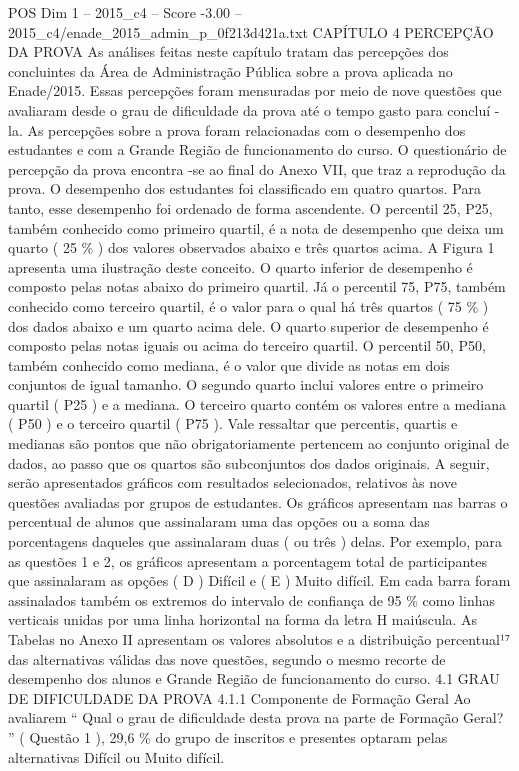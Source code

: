 \begin{textsample}{POS Dim 1 – 2015\_c4 – Score -3.00 – 2015\_c4/enade\_2015\_admin\_p\_0f213d421a.txt}  \label{ex:f1_pos_335}
CAPÍTULO 4 PERCEPÇÃO DA PROVA As análises feitas neste capítulo tratam das percepções dos concluintes da Área de Administração Pública sobre a prova aplicada no Enade/2015.
Essas percepções foram mensuradas por meio de nove questões que avaliaram desde o grau de dificuldade da prova até o tempo gasto para concluí -la.
As percepções sobre a prova foram relacionadas com o desempenho dos estudantes e com a Grande Região de funcionamento do curso.
O questionário de percepção da prova encontra -se ao final do Anexo VII, que traz a reprodução da prova.
O desempenho dos estudantes foi classificado em quatro quartos.
Para tanto, esse desempenho foi ordenado de forma ascendente.
O percentil 25, P25, também conhecido como primeiro quartil, é a nota de desempenho que deixa um quarto ( 25 \% ) dos valores observados abaixo e três quartos acima.
A Figura 1 apresenta uma ilustração deste conceito.
O quarto inferior de desempenho é composto pelas notas abaixo do primeiro quartil.
Já o percentil 75, P75, também conhecido como terceiro quartil, é o valor para o qual há três quartos ( 75 \% ) dos dados abaixo e um quarto acima dele.
O quarto superior de desempenho é composto pelas notas iguais ou acima do terceiro quartil.
O percentil 50, P50, também conhecido como mediana, é o valor que divide as notas em dois conjuntos de igual tamanho.
O segundo quarto inclui valores entre o primeiro quartil ( P25 ) e a mediana.
O terceiro quarto contém os valores entre a mediana ( P50 ) e o terceiro quartil ( P75 ).
Vale ressaltar que percentis, quartis e medianas são pontos que não obrigatoriamente pertencem ao conjunto original de dados, ao passo que os quartos são subconjuntos dos dados originais.
A seguir, serão apresentados gráficos com resultados selecionados, relativos às nove questões avaliadas por grupos de estudantes.
Os gráficos apresentam nas barras o percentual de alunos que assinalaram uma das opções ou a soma das porcentagens daqueles que assinalaram duas ( ou três ) delas.
Por exemplo, para as questões 1 e 2, os gráficos apresentam a porcentagem total de participantes que assinalaram as opções ( D ) Difícil e ( E ) Muito difícil.
Em cada barra foram assinalados também os extremos do intervalo de confiança de 95 \% como linhas verticais unidas por uma linha horizontal na forma da letra H maiúscula.
As Tabelas no Anexo II apresentam os valores absolutos e a distribuição percentual¹⁷ das alternativas válidas das nove questões, segundo o mesmo recorte de desempenho dos alunos e Grande Região de funcionamento do curso. 4.1 GRAU DE DIFICULDADE DA PROVA 4.1.1 Componente de Formação Geral Ao avaliarem “ Qual o grau de dificuldade desta prova na parte de Formação Geral? ” ( Questão 1 ), 29,6 \% do grupo de inscritos e presentes optaram pelas alternativas Difícil ou Muito difícil.

\end{textsample}
